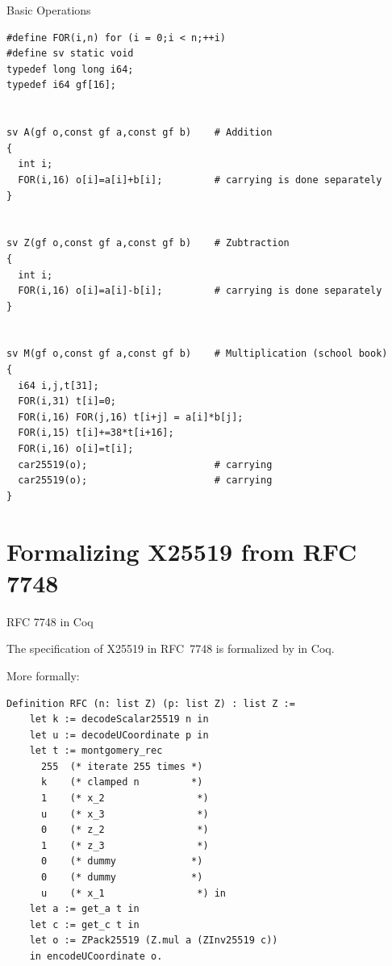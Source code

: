 \documentclass[8pt,aspectratio=169]{beamer}
\begin{document}
%
%
\begin{frame}[fragile]{Basic Operations}
	\begin{center}

		\begin{lstlisting}[language=Ctweetnacl]
#define FOR(i,n) for (i = 0;i < n;++i)
#define sv static void
typedef long long i64;
typedef i64 gf[16];


sv A(gf o,const gf a,const gf b)    # Addition
{
  int i;
  FOR(i,16) o[i]=a[i]+b[i];         # carrying is done separately
}


sv Z(gf o,const gf a,const gf b)    # Zubtraction
{
  int i;
  FOR(i,16) o[i]=a[i]-b[i];         # carrying is done separately
}


sv M(gf o,const gf a,const gf b)    # Multiplication (school book)
{
  i64 i,j,t[31];
  FOR(i,31) t[i]=0;
  FOR(i,16) FOR(j,16) t[i+j] = a[i]*b[j];
  FOR(i,15) t[i]+=38*t[i+16];
  FOR(i,16) o[i]=t[i];
  car25519(o);                      # carrying
  car25519(o);                      # carrying
}
\end{lstlisting}

	\end{center}
\end{frame}


\section{Formalizing X25519 from RFC 7748}

%
%
\begin{frame}[fragile]{RFC 7748 in Coq}
	\begin{informaltheorem}
		The specification of X25519 in RFC~7748 is formalized by  in Coq.
	\end{informaltheorem}

	More formally:
	\begin{center}
		\begin{lstlisting}[language=Coq]
  Definition RFC (n: list Z) (p: list Z) : list Z :=
    let k := decodeScalar25519 n in
    let u := decodeUCoordinate p in
    let t := montgomery_rec
      255  (* iterate 255 times *)
      k    (* clamped n         *)
      1    (* x_2                *)
      u    (* x_3                *)
      0    (* z_2                *)
      1    (* z_3                *)
      0    (* dummy             *)
      0    (* dummy             *)
      u    (* x_1                *) in
    let a := get_a t in
    let c := get_c t in
    let o := ZPack25519 (Z.mul a (ZInv25519 c))
    in encodeUCoordinate o.
  \end{lstlisting}
	\end{center}
\end{frame}
\end{document}
